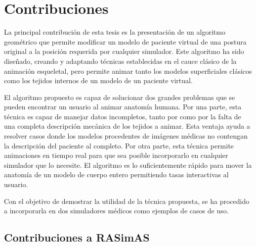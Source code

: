 \section{Contribuciones}
\label{intro:contribuciones}

La principal contribución de esta tesis es la presentación de un algoritmo geométrico que permite modificar un modelo de paciente virtual de una postura original a la posición requerida por cualquier simulador. Este algoritmo ha sido diseñado, creando y adaptando técnicas establecidas en el cauce clásico de la animación esqueletal, pero permite animar tanto los modelos superficiales clásicos como los tejidos internos de un modelo de un paciente virtual.

El algoritmo propuesto es capaz de solucionar dos grandes problemas que se pueden encontrar un usuario al animar anatomía humana. Por una parte, esta técnica es capaz de manejar datos incompletos, tanto por %
como por la falta de una completa descripción mecánica de los tejidos a animar. Esta ventaja ayuda a resolver casos donde los modelos procedentes de imágenes médicas %
 no contengan la descripción del paciente al completo. Por otra parte, esta técnica permite animaciones en tiempo real para que sea posible incorporarlo en cualquier simulador que lo necesite. El algoritmo es lo suficientemente rápido para mover la anatomía de un modelo de cuerpo entero permitiendo tasas interactivas al usuario.

Con el objetivo de demostrar la utilidad de la técnica propuesta, se ha procedido a incorporarla en dos simuladores médicos como ejemplos de casos de uso. 

\subsection{Contribuciones a RASimAS}



